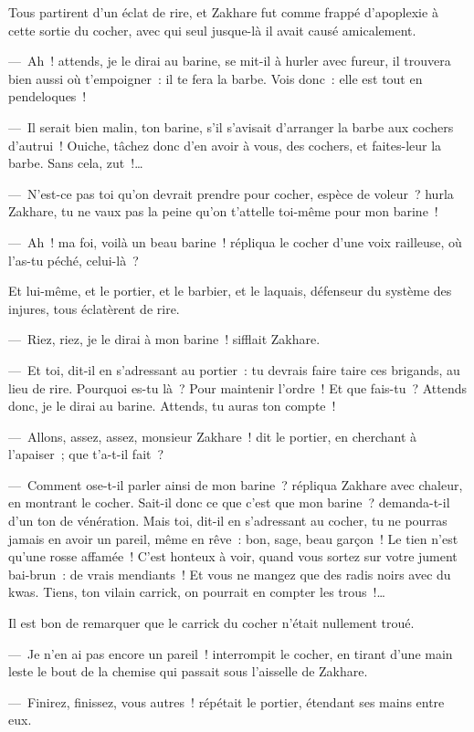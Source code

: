 \documentclass[french,twoside]{book} %
\begin{document}
Tous partirent d’un éclat de rire, et Zakhare fut comme frappé d’apoplexie à cette sortie du cocher, avec qui seul jusque-là il avait causé amicalement.\par
— Ah ! attends, je le dirai au barine, se mit-il à hurler avec fureur, il trouvera bien aussi où t’empoigner : il te fera la barbe. Vois donc : elle est tout en pendeloques !\par
— Il serait bien malin, ton barine, s’il s’avisait d’arranger la barbe aux cochers d’autrui ! Ouiche, tâchez donc d’en avoir à vous, des cochers, et faites-leur la barbe. Sans cela, zut !…\par
— N’est-ce pas toi qu’on devrait prendre pour cocher, espèce de voleur ? hurla Zakhare, tu ne vaux pas la peine qu’on t’attelle toi-même pour mon barine !\par
— Ah ! ma foi, voilà un beau barine ! répliqua le cocher d’une voix railleuse, où l’as-tu péché, celui-là ?\par
Et lui-même, et le portier, et le barbier, et le laquais, défenseur du système des injures, tous éclatèrent de rire.\par
— Riez, riez, je le dirai à mon barine ! sifflait Zakhare.\par
— Et toi, dit-il en s’adressant au portier : tu devrais faire taire ces brigands, au lieu de rire. Pourquoi es-tu là ? Pour maintenir l’ordre ! Et que fais-tu ? Attends donc, je le dirai au barine. Attends, tu auras ton compte !\par
— Allons, assez, assez, monsieur Zakhare ! dit le portier, en cherchant à l’apaiser ; que t’a-t-il fait ?\par
— Comment ose-t-il parler ainsi de mon barine ? répliqua Zakhare avec chaleur, en montrant le cocher. Sait-il donc ce que c’est que mon barine ? demanda-t-il d’un ton de vénération. Mais toi, dit-il en s’adressant au cocher, tu ne pourras jamais en avoir un pareil, même en rêve : bon, sage, beau garçon ! Le tien n’est qu’une rosse affamée ! C’est honteux à voir, quand vous sortez sur votre jument bai-brun : de vrais mendiants ! Et vous ne mangez que des radis noirs avec du kwas. Tiens, ton vilain carrick, on pourrait en compter les trous !…\par
Il est bon de remarquer que le carrick du cocher n’était nullement troué.\par
— Je n’en ai pas encore un pareil ! interrompit le cocher, en tirant d’une main leste le bout de la chemise qui passait sous l’aisselle de Zakhare.\par
— Finirez, finissez, vous autres ! répétait le portier, étendant ses mains entre eux.\par
\end{document}
